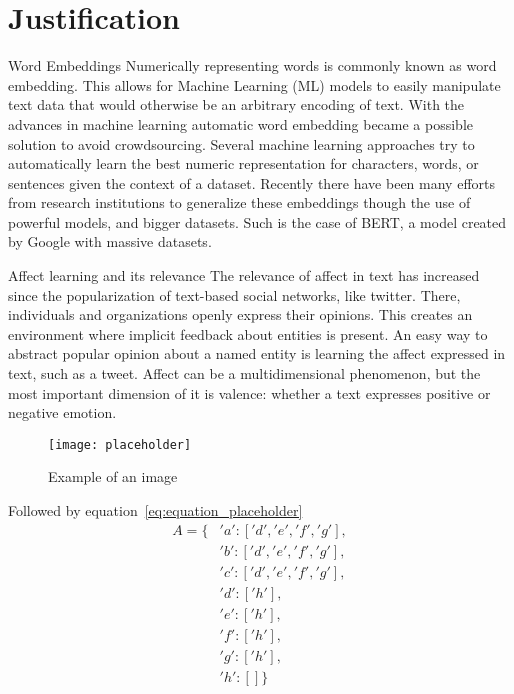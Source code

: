 \section{Justification}\label{sec:Justification}

Word Embeddings
Numerically representing words is commonly known as word embedding. This allows for Machine Learning (ML) models to easily manipulate text data that would otherwise be an arbitrary encoding of text. With the advances in machine learning automatic word embedding became a possible solution to avoid crowdsourcing. %
Several machine learning approaches try to automatically learn the best numeric representation for characters, words, or sentences given the context of a dataset. Recently there have been many efforts from research institutions to generalize these embeddings though the use of powerful models, and bigger datasets. Such is the case of BERT, a model created by Google with massive datasets.

Affect learning and its relevance
The relevance of affect in text has increased since the popularization of text-based social networks, like twitter. There, individuals and organizations openly express their opinions. This creates an environment where implicit feedback about entities is present. An easy way to abstract popular opinion about a named entity is learning the affect expressed in text, such as a tweet. Affect can be a multidimensional phenomenon, but the most important dimension of it is valence: whether a text expresses positive or negative emotion.


\begin{figure}[H]
  \texttt{[image: placeholder]}
  \centering
  \caption{Example of an image}
\end{figure}\label{fig:placeholder}



Followed by equation~\ref{eq:equation_placeholder}
\begin{equation} \label{eq:equation_placeholder}
  \begin{split}
    A = \{&'a':['d','e','f','g'], \\
         &'b':['d','e','f','g'], \\
         &'c':['d','e','f','g'], \\
         &'d':['h'], \\
         &'e':['h'], \\
         &'f':['h'], \\
         &'g':['h'], \\
         &'h':[] \}
  \end{split}
\end{equation}
